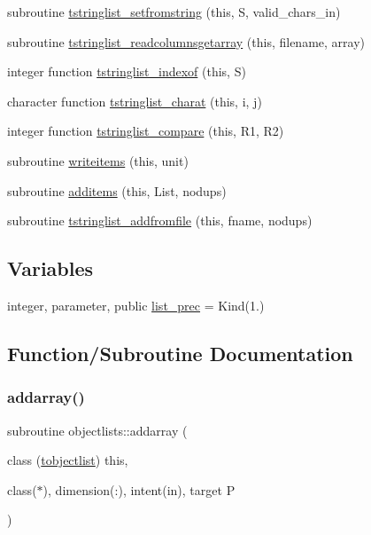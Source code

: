 \begin{DoxyCompactItemize}
\item 
subroutine \mbox{\hyperlink{namespaceobjectlists_a2c19308a10df8614e054244fe735e6d1}{tstringlist\+\_\+setfromstring}} (this, S, valid\+\_\+chars\+\_\+in)
\item 
subroutine \mbox{\hyperlink{namespaceobjectlists_adea8776aebb466be94d770772a73f756}{tstringlist\+\_\+readcolumnsgetarray}} (this, filename, array)
\item 
integer function \mbox{\hyperlink{namespaceobjectlists_a926298e78fd013f34f503ab38a3bc496}{tstringlist\+\_\+indexof}} (this, S)
\item 
character function \mbox{\hyperlink{namespaceobjectlists_abe1b434a57e0d690b22c8410ca9cfff0}{tstringlist\+\_\+charat}} (this, i, j)
\item 
integer function \mbox{\hyperlink{namespaceobjectlists_a2050ccdefc2f19e1dbc8fac3a91d51d0}{tstringlist\+\_\+compare}} (this, R1, R2)
\item 
subroutine \mbox{\hyperlink{namespaceobjectlists_a1735569cf51270522157e13dfdcedcc3}{writeitems}} (this, unit)
\item 
subroutine \mbox{\hyperlink{namespaceobjectlists_a4891ff4be9767fe63e6223924e02c450}{additems}} (this, List, nodups)
\item 
subroutine \mbox{\hyperlink{namespaceobjectlists_a53c9a728110b79f25cc56f9b63554deb}{tstringlist\+\_\+addfromfile}} (this, fname, nodups)
\end{DoxyCompactItemize}
\subsection*{Variables}
\begin{DoxyCompactItemize}
\item 
integer, parameter, public \mbox{\hyperlink{namespaceobjectlists_a9d176bc6347eefeceba8cb520c6be81c}{list\+\_\+prec}} = Kind(1.)
\end{DoxyCompactItemize}


\subsection{Function/\+Subroutine Documentation}
\mbox{\label{namespaceobjectlists_aff0d8c1f6bf740fa33ba6c02cca08daf}} 
\subsubsection{\texorpdfstring{addarray()}{addarray()}}
{\footnotesize\ttfamily subroutine objectlists\+::addarray (\begin{DoxyParamCaption}\item[{class (\mbox{\hyperlink{structobjectlists_1_1tobjectlist}{tobjectlist}})}]{this,  }\item[{class($\ast$), dimension(\+:), intent(in), target}]{P }\end{DoxyParamCaption})\hspace{0.3cm}{\ttfamily [private]}}



